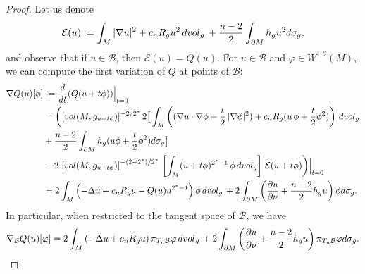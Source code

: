\documentclass[10pt,a4paper]{amsart}
\newcommand{\B}{\mathcal{B}}
\newcommand{\vol}{{\rm{vol}}}
\begin{document}
\begin{proof} 
	  Let us denote
	$$
	\mathcal E(u):=\int_M  |\nabla u|^2+ c_n R_gu^2\,d\vol_g\,+\frac{n-2}{2}\int_{\partial M} h_g u^2 d\sigma_g,
	$$ 
	and observe that if $u\in \B$, then $\mathcal E(u)=Q(u)$. For $u\in \B$ and $\varphi \in W^{1,2}(M)$,  we can compute the first variation of $Q$ at points of $\B$:
	\begin{align}
	\nabla Q(u)[\phi] &:= \frac{d}{dt}(Q (u + t\phi))\Big|_{t=0}\\ 
	&=\bigg( [\vol(M, g_{u+t\phi})]^{-2/2^*}\, 2\big[\int_M\left(( \nabla u\cdot\nabla \phi+\frac{t}{2}\,|\nabla \phi|^2)+c_n R_g(u\,\phi+\frac{t}{2}\phi^2)\right)\,d\vol_g \notag\\
    &+ \frac{n-2}{2}\int_{\partial M}h_g(u\phi+\frac{t}{2}\phi^2)d\sigma_g \big] \notag \\
	 &  -2\,\left[\vol(M, g_{u+t\phi}) \right]^{-(2+2^*)/2^*}\, \left[\int_M (u+t\phi)^{2^*-1} \,\phi \,d\vol_g\right]  \,\mathcal E(u+t\phi)\bigg)\Big|_{t=0} \notag 
	\\
	&= 2 \int_{M} \left(-\Delta u + c_nR_gu-Q(u)u^{2^*-1}\right)\phi\, d\vol_g\, + 2\int_{\partial M} \left( \frac{\partial u}{\partial \nu}+\frac{n-2}{2}h_g u   \right)\phi d\sigma_g.
    \end{align} 
	In particular, when restricted to the tangent space of $\B$, we have
	$$
	\nabla_{\B} Q(u)[\varphi] = 2\int_{M} \left(-\Delta u + c_nR_gu\right)\pi_{T_u\B}\varphi\, d\vol_g\, +2\int_{\partial M} \left( \frac{\partial u}{\partial \nu}+\frac{n-2}{2}h_g u   \right)\pi_{T_u\B}\varphi d\sigma_g .
	$$


\end{proof}
\end{document}
